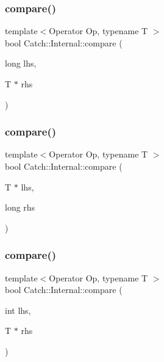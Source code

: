 \mbox{\label{namespace_catch_1_1_internal_a829570ad9e724c687aa42190a696032b}} 
\subsubsection{\texorpdfstring{compare()}{compare()}\hspace{0.1cm}{\footnotesize\ttfamily [14/17]}}
{\footnotesize\ttfamily template$<$Operator Op, typename T $>$ \\
bool Catch\+::\+Internal\+::compare (\begin{DoxyParamCaption}\item[{long}]{lhs,  }\item[{T $\ast$}]{rhs }\end{DoxyParamCaption})}

\mbox{\label{namespace_catch_1_1_internal_a3f89c65fdb06aa7b648c5acf0ca107a9}} 
\subsubsection{\texorpdfstring{compare()}{compare()}\hspace{0.1cm}{\footnotesize\ttfamily [15/17]}}
{\footnotesize\ttfamily template$<$Operator Op, typename T $>$ \\
bool Catch\+::\+Internal\+::compare (\begin{DoxyParamCaption}\item[{T $\ast$}]{lhs,  }\item[{long}]{rhs }\end{DoxyParamCaption})}

\mbox{\label{namespace_catch_1_1_internal_a4f30c29e4adb62c7e209e5b988e59397}} 
\subsubsection{\texorpdfstring{compare()}{compare()}\hspace{0.1cm}{\footnotesize\ttfamily [16/17]}}
{\footnotesize\ttfamily template$<$Operator Op, typename T $>$ \\
bool Catch\+::\+Internal\+::compare (\begin{DoxyParamCaption}\item[{int}]{lhs,  }\item[{T $\ast$}]{rhs }\end{DoxyParamCaption})}

